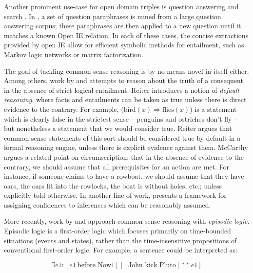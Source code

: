 Another prominent use-case for open domain triples is
  question answering and search \cite{key:2014fader-openqa,key:2011etzioni-nature}. 
In , a set of question paraphrases is mined from a large
  question answering corpus; these paraphrases are then applied to a new question until
  it matches a known Open IE relation.
In each of these cases, the concise extractions provided by open IE allow
  for efficient symbolic methods for entailment, such as Markov logic
  networks or matrix factorization.


%
%

The goal of tackling common-sense reasoning is by no means novel in
  itself either.
Among others, work by  and 
  attempts to reason about the truth of a consequent in the absence of strict logical entailment.
Reiter introduces a notion of \textit{default reasoning}, where facts and entailments can be
  taken as true unless there is direct evidence to the contrary.
For example,  ($\textrm{bird}(x) \Rightarrow \textrm{flies}(x)$) is a statement which
  is clearly false in the strictest sense -- penguins and ostriches don't fly -- but nonetheless
  a statement that we would consider true.
Reiter argues that common-sense statements of this sort should be considered true by default in
  a formal reasoning engine, unless there is explicit evidence against them.
McCarthy argues a related point on circumscription: that in the absence of evidence to the contrary,
  we should assume that all prerequisites for an action are met.
For instance, if someone claims to have a rowboat, we should assume that they have oars, the oars
  fit into the rowlocks, the boat is without holes, etc.; unless explicitly told otherwise.
In another line of work,  presents a framework for
  assigning confidences to inferences which can be reasonably assumed.

More recently, work by  and
   approach common sense reasoning
  with \textit{episodic logic}.
Episodic logic is a first-order logic which focuses primarily on time-bounded
  situations (events and states), rather than the time-insensitive propositions
  of conventional first-order logic.
For example, a sentence  could be interpreted as:

\begin{equation*}
\exists e1 : [ e1 ~ \textrm{before Now1} ] \left[ [ \textrm{John kick Pluto} ] **~ e1 \right]
\end{equation*}

